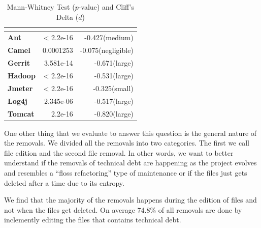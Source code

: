 \begin{table}[!thb]
	\begin{center}
		\caption{Mann-Whitney Test ($p$-value) and Cliff's Delta ($d$)}
		\label{tbl:statistic}
		\begin{tabular}{l| rr}
			\toprule
			\textbf{\thead{Project}} & \textbf{\thead{$p$-value}} & \textbf{\thead{$d$}}\\ 
			\midrule
			\textbf{Ant   }   &  < 2.2e-16  &  -0.427(medium)  \\  
			\textbf{Camel }   &  0.0001253  &  -0.075(negligible)  \\  
			\textbf{Gerrit}   &  3.581e-14  &  -0.671(large)  \\  
			\textbf{Hadoop}   &  < 2.2e-16  &  -0.531(large)  \\  
			\textbf{Jmeter}   &  < 2.2e-16  &  -0.325(small)  \\  
			\textbf{Log4j }   &  2.345e-06  &  -0.517(large)  \\  
			\textbf{Tomcat}   &  2.2e-16    &  -0.820(large) \\  
			\bottomrule
		\end{tabular}
	\end{center}    
\end{table}






One other thing that we evaluate to answer this question is the general nature of the removals. We divided all the removals into two categories. The first we call file edition and the second file removal. In other words, we want to better understand if the removals of technical debt are happening as the project evolves and resembles a ``floss refactoring'' type of maintenance or if the files just gets deleted after a time due to its entropy. 

We find that the majority of the removals happens during the edition of files and not when the files get deleted. On average 74.8\% of all removals are done by inclemently editing the files that contains technical debt.




